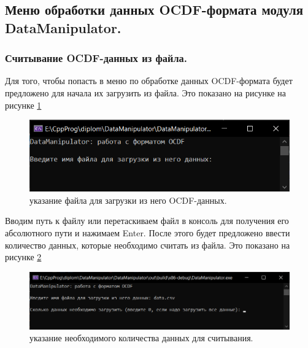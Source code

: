 \subsection{ \standartTitleFont
  Меню обработки данных OCDF-формата модуля DataManipulator. 
} 

\subsubsection{ \standartTitleFont
  Считывание OCDF-данных из файла. 
} 

{\standartFont

  \par Для того, чтобы попасть в меню по обработке данных OCDF-формата будет предложено для начала их загрузить из файла. Это показано на рисунке на рисунке \ref{fig:readOCDFst1}

  \begin{figure}[H]
    \centering
    \includegraphics[width=\textwidth]{images/readOCDFstage1.png}
    \caption{указание файла для загрузки из него OCDF-данных.} 
    \label{fig:readOCDFst1}
  \end{figure}

  \par Вводим путь к файлу или перетаскиваем файл в консоль для получения его абсолютного пути и нажимаем Enter. После этого будет предложено ввести количество данных, которые необходимо считать из файла. Это показано на рисунке \ref{fig:readOCDFst2}

  \begin{figure}[H]
    \centering
    \includegraphics[width=\textwidth]{images/readOCDFstage2.png}
    \caption{указание необходимого количества данных для считывания.} 
    \label{fig:readOCDFst2}
  \end{figure}

}
